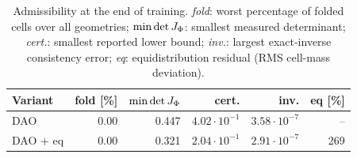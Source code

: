 \begin{table}[t]
\centering
\small
\setlength{\tabcolsep}{5pt}
\caption{Admissibility at the end of training.  \emph{fold}: worst percentage of folded cells over all geometries; $\min\det J_\Phi$: smallest measured determinant; \emph{cert.}: smallest reported lower bound; \emph{inv.}: largest exact-inverse consistency error; \emph{eq}: equidistribution residual (RMS cell-mass deviation).}
\label{tab:admissible}
\begin{tabular}{lrrrrr}
\toprule
Variant & fold [\%] & $\min\det J_\Phi$ & cert. & inv. & eq [\%] \\
\midrule
DAO & 0.00 & 0.447 & $4.02\cdot10^{-1}$ & $3.58\cdot10^{-7}$ & -- \\
DAO + eq & 0.00 & 0.321 & $2.04\cdot10^{-1}$ & $2.91\cdot10^{-7}$ & 269 \\
\bottomrule
\end{tabular}
\end{table}
